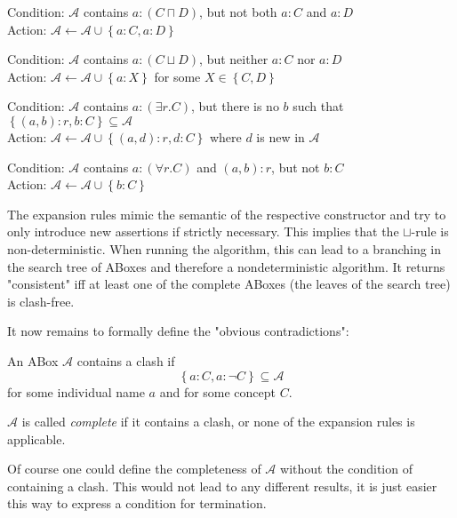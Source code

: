 \begin{mdframed}[frametitle = expansion rules]
	\begin{mdframed}[frametitle= The $\sqcap$-rule]
		Condition: $\mathcal{A}$ contains $a: (C \sqcap D)$, but not both $a:C$ and $a:D$ \\
		Action: $\mathcal{A} \leftarrow \mathcal{A} \cup \left\{ a:C, a:D \right\} $
	\end{mdframed}
	\begin{mdframed}[frametitle= The $\sqcup$-rule]
		Condition: $\mathcal{A}$ contains $a: (C \sqcup D)$, but neither $a:C$ nor $a:D$\\
		Action: $\mathcal{A} \leftarrow \mathcal{A} \cup \left\{ a:X \right\} $ for some $X \in \left\{ C,D \right\}$
	\end{mdframed}
	\begin{mdframed}[frametitle= The $\exists$-rule]
		Condition: $\mathcal{A}$ contains $a:(\exists r.C)$, but there is no $b$ such that \\$\left\{ (a,b) :r, b:C \right\} \subseteq \mathcal{A}$ \\
		Action: $\mathcal{A} \leftarrow \mathcal{A} \cup \left\{ (a,d):r, d:C \right\} $ where $d$ is new in $\mathcal{A}$
	\end{mdframed}
	\begin{mdframed}[frametitle= The $\forall$-rule]
		Condition: $\mathcal{A}$ contains $a:(\forall r.C)$ and $(a,b):r$, but not $b:C$\\
		Action: $\mathcal{A} \leftarrow \mathcal{A} \cup \left\{ b:C\right\} $
	\end{mdframed}
\end{mdframed}
\begin{note}
	The expansion rules mimic the semantic of the respective constructor
	and try to only introduce new assertions if strictly necessary.
	This implies that the $\sqcup$-rule is non-deterministic.
	When running the algorithm, this can lead to a branching in the search tree of ABoxes
	and therefore a nondeterministic algorithm.
	It returns "consistent" iff at least one of the complete ABoxes (the leaves of the search tree) is clash-free.
\end{note}

It now remains to formally define the "obvious contradictions":
\begin{definition}
	An ABox $\mathcal{A}$ contains a clash if
	\[
	\left\{ a:C, a: \neg C \right\} \subseteq \mathcal{A}
	\]
	for some individual name $a$ and for some concept $C$.

	$\mathcal{A}$ is called \textit{complete} if it contains a clash, or none of the expansion rules is applicable.
\end{definition}
\begin{note}
	Of course one could define the completeness of $\mathcal{A}$ without the condition of containing a clash.
	This would not lead to any different results, it is just easier this way to express a condition for termination.
\end{note}
